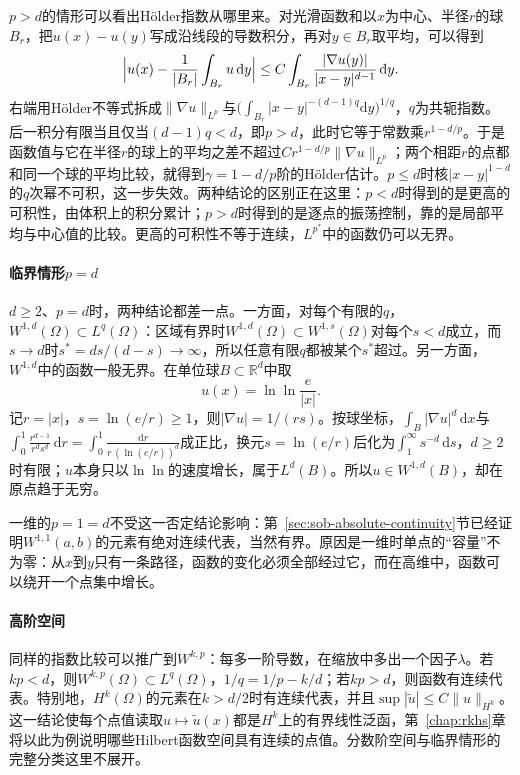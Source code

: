 $p>d$的情形可以看出Hölder指数从哪里来。对光滑函数和以$x$为中心、半径$r$的球$B_r$，把$u(x)-u(y)$写成沿线段的导数积分，再对$y\in B_r$取平均，可以得到
\[
 \Bigl|u(x)-\frac{1}{|B_r|}\int_{B_r}u\,\mathrm dy\Bigr|\le C\int_{B_r}\frac{|\nabla u(y)|}{|x-y|^{d-1}}\,\mathrm dy .
\]
右端用Hölder不等式拆成$\|\nabla u\|_{L^p}$与$\bigl(\int_{B_r}|x-y|^{-(d-1)q}\mathrm dy\bigr)^{1/q}$，$q$为共轭指数。后一积分有限当且仅当$(d-1)q<d$，即$p>d$，此时它等于常数乘$r^{1-d/p}$。于是函数值与它在半径$r$的球上的平均之差不超过$Cr^{1-d/p}\|\nabla u\|_{L^p}$；两个相距$r$的点都和同一个球的平均比较，就得到$\gamma=1-d/p$阶的Hölder估计。$p\le d$时核$|x-y|^{1-d}$的$q$次幂不可积，这一步失效。两种结论的区别正在这里：$p<d$时得到的是更高的可积性，由体积上的积分累计；$p>d$时得到的是逐点的振荡控制，靠的是局部平均与中心值的比较。更高的可积性不等于连续，$L^{p^*}$中的函数仍可以无界。

\paragraph{临界情形$p=d$}
$d\ge2$、$p=d$时，两种结论都差一点。一方面，对每个有限的$q$，$W^{1,d}(\Omega)\subset L^q(\Omega)$：区域有界时$W^{1,d}(\Omega)\subset W^{1,s}(\Omega)$对每个$s<d$成立，而$s\to d$时$s^*=ds/(d-s)\to\infty$，所以任意有限$q$都被某个$s^*$超过。另一方面，$W^{1,d}$中的函数一般无界。在单位球$B\subset\mathbb R^d$中取
\[
 u(x)=\ln\ln\frac{e}{|x|} .
\]
记$r=|x|$，$s=\ln(e/r)\ge1$，则$|\nabla u|=1/(rs)$。按球坐标，$\int_B|\nabla u|^d\,\mathrm dx$与$\int_0^1\frac{r^{d-1}}{r^ds^d}\,\mathrm dr=\int_0^1\frac{\mathrm dr}{r\,(\ln(e/r))^d}$成正比，换元$s=\ln(e/r)$后化为$\int_1^\infty s^{-d}\,\mathrm ds$，$d\ge2$时有限；$u$本身只以$\ln\ln$的速度增长，属于$L^d(B)$。所以$u\in W^{1,d}(B)$，却在原点趋于无穷。

一维的$p=1=d$不受这一否定结论影响：第~\ref{sec:sob-absolute-continuity}节已经证明$W^{1,1}(a,b)$的元素有绝对连续代表，当然有界。原因是一维时单点的“容量”不为零：从$x$到$y$只有一条路径，函数的变化必须全部经过它，而在高维中，函数可以绕开一个点集中增长。

\paragraph{高阶空间}
同样的指数比较可以推广到$W^{k,p}$：每多一阶导数，在缩放中多出一个因子$\lambda$。若$kp<d$，则$W^{k,p}(\Omega)\subset L^q(\Omega)$，$1/q=1/p-k/d$；若$kp>d$，则函数有连续代表。特别地，$H^k(\Omega)$的元素在$k>d/2$时有连续代表，并且$\sup|\tilde u|\le C\|u\|_{H^k}$。这一结论使每个点值读取$u\mapsto\tilde u(x)$都是$H^k$上的有界线性泛函，第~\ref{chap:rkhs}章将以此为例说明哪些Hilbert函数空间具有连续的点值。分数阶空间与临界情形的完整分类这里不展开。

